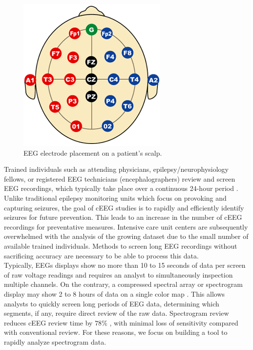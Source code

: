 \begin{figure}[h]
\begin{center}
\includegraphics[scale=0.5]{./img/electrodes.png}
\caption{EEG electrode placement on a patient's scalp.}
\label{fig:electrodes}
\end{center}
\end{figure}

Trained individuals such as attending physicians, epilepsy/neurophysiology
fellows, or registered EEG technicians (encephalographers) review and screen
EEG recordings, which typically take place over a continuous 24-hour period
\cite{ceeg-3}.  Unlike traditional epilepsy monitoring units which focus on
provoking and capturing seizures, the goal of cEEG studies is to rapidly and
efficiently identify seizures for future prevention. This leads to an increase
in the number of cEEG recordings for preventative measures. Intensive care unit
centers are subsequently overwhelmed with the analysis of the growing dataset
due to the small number of available trained individuals. Methods to screen
long EEG recordings without sacrificing accuracy are necessary to be able to
process this data. \\

Typically, EEGs displays show no more than 10 to 15 seconds of data per screen
of raw voltage readings and requires an analyst to simultaneously inspection
multiple channels. On the contrary, a compressed spectral array \cite{csa} or
spectrogram display may show 2 to 8 hours of data on a single color map
\cite{ceeg-3}. This allows analysts to quickly screen long periods of EEG data,
determining which segments, if any, require direct review of the raw data.
Spectrogram review reduces cEEG review time by $78\%$ \cite{ceeg-2}, with
minimal loss of sensitivity compared with conventional review. For these
reasons, we focus on building a tool to rapidly analyze spectrogram data. \\

